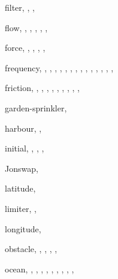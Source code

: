 \documentclass[12pt]{book}
\begin{document}
\begin{theindex}
  \indexspace

  \item filter, , , 
  \item flow, , , , 
		, , 
  \item force, , , , 
		, 
  \item frequency, , , , 
		, , , 
		, , , 
		, , 
		, , , 
  \item friction, , , , 
		, , , 
		, , , 

  \indexspace

  \item garden-sprinkler, 

  \indexspace

  \item harbour, , 

  \indexspace

  \item initial, , , , 

  \indexspace

  \item Jonswap, 

  \indexspace

  \item latitude, 
  \item limiter, , 
  \item longitude, 

  \indexspace

  \item obstacle, , , , 
		, 
  \item ocean, , , , 
		, , , 
		, , , 


\end{theindex}
\end{document}
